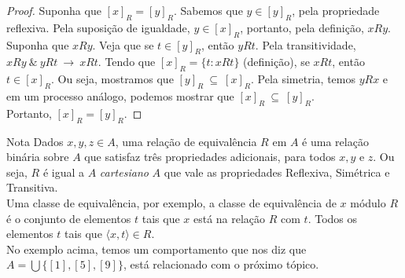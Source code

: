 \begin{proof}
  Suponha que $[x]_{R} = [y]_{R}$. Sabemos que $y \in [y]_{R}$, pela propriedade reflexiva. Pela suposição de igualdade, $y \in [x]_{R}$, portanto, pela definição, $xRy$.
  Suponha que $xRy$. Veja que se $t \in [y]_{R}$, então $yRt$. Pela transitividade, $xRy\ \&\ yRt\ \rightarrow\ xRt$.
  Tendo que $[x]_{R} = \{t: xRt\}$ (definição), se $xRt$, então $t \in [x]_{R}$. Ou seja, mostramos que $[y]_{R}\ \subseteq\ [x]_{R}$.
  Pela simetria, temos $yRx$ e em um processo análogo, podemos mostrar que $[x]_{R}\ \subseteq\ [y]_{R}$.\\
  Portanto, $[x]_{R} = [y]_{R}$.
\end{proof}
\begin{mymdframed}{Nota}  
  Dados $x,y,z \in A$, uma relação de equivalência $R$ em $A$ é uma relação binária sobre $A$ que satisfaz três propriedades adicionais, para todos $x, y$ e $z$. Ou seja, $R$ é igual a $A$ \textit{cartesiano} $A$ que vale as propriedades Reflexiva, Simétrica e Transitiva.\\
  Uma classe de equivalência, por exemplo, a classe de equivalência de $x$ módulo $R$ é o conjunto de elementos $t$ tais que $x$ está na relação $R$ com $t$. Todos os elementos $t$ tais que $\langle x, t \rangle \in R$.\\
  No exemplo acima, temos um comportamento que nos diz que $A = \bigcup\{[1], [5], [9]\}$, está relacionado com o próximo tópico.
\end{mymdframed}

